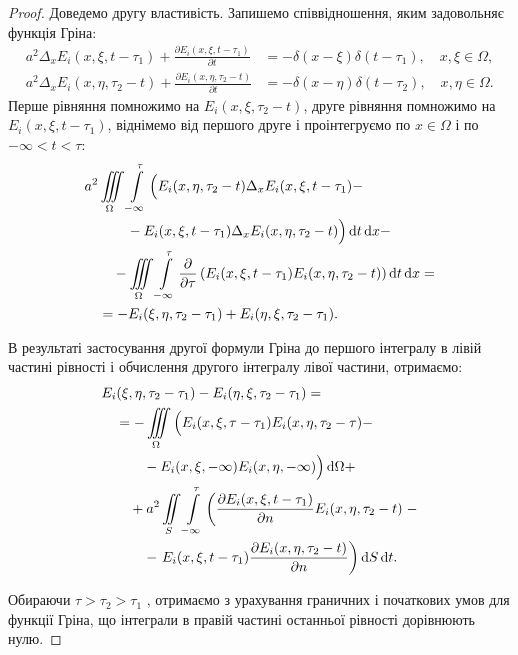 \begin{proof}
	Доведемо другу властивість. Запишемо співвідношення, яким задовольняє функція Гріна:
	\begin{align}
		a^2 \Delta_x E_i(x, \xi, t - \tau_1) + \frac{\partial E_i(x, \xi, t - \tau_1)}{\partial t} &= - \delta(x - \xi) \delta (t - \tau_1), \quad x, \xi \in \Omega, \\
		a^2 \Delta_x E_i(x, \eta, \tau_2 - t) + \frac{\partial E_i(x, \eta, \tau_2 - t)}{\partial t} &= - \delta(x - \eta) \delta (t - \tau_2), \quad x, \eta \in \Omega.
	\end{align}
	Перше рівняння помножимо на $E_i(x, \xi, \tau_2 - t)$, друге рівняння помножимо на $E_i(x, \xi, t - \tau_1)$, віднімемо від першого друге і проінтегруємо по $x \in \Omega$ і по $-\infty < t < \tau$:
	\begin{equation}
		\begin{aligned}
			& a^2 \displaystyle\iiint\limits_\Omega \displaystyle\int\limits_{-\infty}^\tau \Big( E_i(x, \eta, \tau_2 - t) \Delta_x E_i(x, \xi, t - \tau_1) - \\
			& \qquad \quad - E_i(x, \xi, t - \tau_1) \Delta_x E_i(x, \eta, \tau_2 - t) \Big) \mathop{}\!\mathrm{d} t \mathop{}\!\mathrm{d} x - \\
			& \qquad - \displaystyle\iiint\limits_\Omega \displaystyle\int\limits_{-\infty}^\tau \frac{\partial}{\partial \tau} \left( E_i(x, \xi, t - \tau_1) E_i(x, \eta, \tau_2 - t) \right) \mathop{}\!\mathrm{d} t \mathop{}\!\mathrm{d} x = \\
			& \quad = - E_i(\xi, \eta, \tau_2 - \tau_1) + E_i(\eta, \xi, \tau_2 - \tau_1).
		\end{aligned}
	\end{equation}

	В результаті застосування другої формули Гріна до першого інтегралу в лівій частині рівності і обчислення другого інтегралу лівої частини, отримаємо:
	\begin{equation}
		\begin{aligned}
			& E_i(\xi, \eta, \tau_2 - \tau_1 ) - E_i(\eta, \xi, \tau_2 - \tau_1) = \\
			& \quad = - \displaystyle\iiint\limits_\Omega \Big( E_i(x, \xi, \tau - \tau_1) E_i(x, \eta, \tau_2 - \tau) - \\
			& \qquad \quad - E_i(x, \xi, -\infty) E_i(x, \eta, -\infty) \Big) \mathop{}\!\mathrm{d} \Omega + \\
			& \qquad + a^2 \displaystyle\iint\limits_S \displaystyle\int\limits_{-\infty}^\tau \left( \frac{\partial E_i(x, \xi, t - \tau_1)}{\partial n} E_i(x, \eta, \tau_2 - t) \right. - \\
			& \qquad \quad - \left. E_i(x, \xi, t - \tau_1) \frac{\partial E_i(x, \eta, \tau_2 - t)}{\partial n} \right) \mathop{}\!\mathrm{d} S \mathop{}\!\mathrm{d} t.
		\end{aligned}
	\end{equation}

	Обираючи $\tau > \tau_2 > \tau_1$ , отримаємо з урахування граничних і початкових умов для функції Гріна, що інтеграли в правій частині останньої рівності дорівнюють нулю.
\end{proof}

